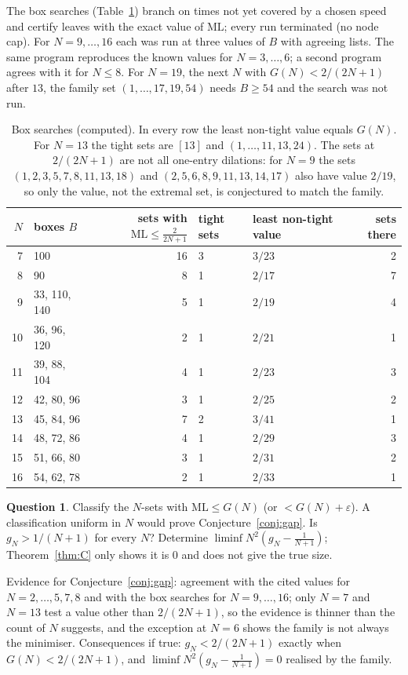 \documentclass[11pt]{article}
\theoremstyle{definition}
\newtheorem{question}[theorem]{Question}
\theoremstyle{remark}
\newcommand{\ML}{\mathrm{ML}}
\begin{document}
The box searches (Table~\ref{tab:box}) branch on times not yet covered by a chosen speed and certify leaves with the exact value of $\ML$; every run terminated (no node cap). For $N=9,\dots,16$ each was run at three values of $B$ with agreeing lists. The same program reproduces the known values for $N=3,\dots,6$; a second program agrees with it for $N\le8$. For $N=19$, the next $N$ with $G(N)<2/(2N+1)$ after $13$, the family set $(1,\dots,17,19,54)$ needs $B\ge54$ and the search was not run.
\begin{table}[ht]
\centering
\small
\begin{tabular}{r l r l l r}
\toprule
$N$ & boxes $B$ & sets with $\ML\le\frac2{2N+1}$ & tight sets & least non-tight value & sets there \\
\midrule
7 & 100 & 16 & 3 & $3/23$ & 2 \\
8 & 90 & 8 & 1 & $2/17$ & 7 \\
9 & 33, 110, 140 & 5 & 1 & $2/19$ & 4 \\
10 & 36, 96, 120 & 2 & 1 & $2/21$ & 1 \\
11 & 39, 88, 104 & 4 & 1 & $2/23$ & 3 \\
12 & 42, 80, 96 & 3 & 1 & $2/25$ & 2 \\
13 & 45, 84, 96 & 7 & 2 & $3/41$ & 1 \\
14 & 48, 72, 86 & 4 & 1 & $2/29$ & 3 \\
15 & 51, 66, 80 & 3 & 1 & $2/31$ & 2 \\
16 & 54, 62, 78 & 2 & 1 & $2/33$ & 1 \\
\bottomrule
\end{tabular}
\caption{Box searches (computed). In every row the least non-tight value equals $G(N)$. For $N=13$ the tight sets are $[13]$ and $(1,\dots,11,13,24)$. The sets at $2/(2N+1)$ are not all one-entry dilations: for $N=9$ the sets $(1,2,3,5,7,8,11,13,18)$ and $(2,5,6,8,9,11,13,14,17)$ also have value $2/19$, so only the value, not the extremal set, is conjectured to match the family.}
\label{tab:box}
\end{table}

\begin{question}\label{q:class}
Classify the $N$-sets with $\ML\le G(N)$ (or $<G(N)+\varepsilon$). A classification uniform in $N$ would prove Conjecture~\ref{conj:gap}. Is $g_N>1/(N+1)$ for every $N$? Determine $\liminf N^2(g_N-\frac1{N+1})$; Theorem~\ref{thm:C} only shows it is $0$ and does not give the true size.
\end{question}
Evidence for Conjecture~\ref{conj:gap}: agreement with the cited values for $N=2,\dots,5,7,8$ and with the box searches for $N=9,\dots,16$; only $N=7$ and $N=13$ test a value other than $2/(2N+1)$, so the evidence is thinner than the count of $N$ suggests, and the exception at $N=6$ shows the family is not always the minimiser. Consequences if true: $g_N<2/(2N+1)$ exactly when $G(N)<2/(2N+1)$, and $\liminf N^2(g_N-\frac1{N+1})=0$ realised by the family.
\end{document}

